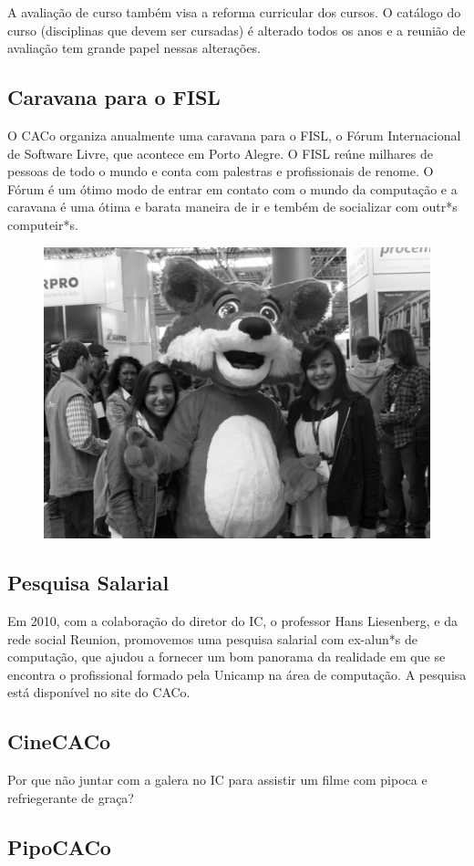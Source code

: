A avaliação de curso também visa a reforma curricular dos cursos. O catálogo do
curso (disciplinas que devem ser cursadas) é alterado todos os anos e a reunião
de avaliação tem grande papel nessas alterações.

\subsection{Caravana para o FISL}

O CACo organiza anualmente uma caravana para o FISL, o Fórum Internacional de
Software Livre, que acontece em Porto Alegre. O FISL reúne milhares de pessoas
de todo o mundo e conta com palestras e profissionais de renome. O Fórum é um
ótimo modo de entrar em contato com o mundo da computação e a caravana é uma
ótima e barata maneira de ir e tembém de socializar com outr*s computeir*s.

\begin{figure}[H]
    \centering
    \includegraphics[width=.45\textwidth]{img/alem_da_graduacao/caco_fisl1.jpg}
\end{figure}

\subsection{Pesquisa Salarial}

Em 2010, com a colaboração do diretor do IC, o professor Hans Liesenberg, e da
rede social Reunion, promovemos uma pesquisa salarial com ex-alun*s de
computação, que ajudou a fornecer um bom panorama da realidade em que se
encontra o profissional formado pela Unicamp na área de computação. A pesquisa
está disponível no site do CACo.

\subsection{CineCACo}

Por que não juntar com a galera no IC para assistir um filme com pipoca e
refriegerante de graça?

\subsection{PipoCACo}

